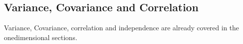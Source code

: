 \subsection{Variance, Covariance and Correlation}
Variance, Covariance, correlation and independence are already covered in the onedimensional sections.






